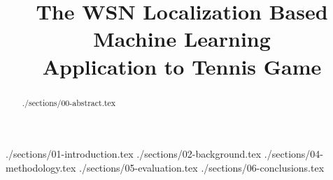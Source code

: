 \documentclass[10pt,conference,compsocconf]{styles/IEEEtran}
\def\SECDIR{./sections}            %
\def\STYDIR{./styles}            %
\begin{document}
%
\title{The WSN Localization Based Machine Learning \\ Application to Tennis Game}

\author{
}


\maketitle


\begin{abstract}
 \SECDIR/00-abstract.tex
\end{abstract}


 \SECDIR/01-introduction.tex
 \SECDIR/02-background.tex
 \SECDIR/04-methodology.tex
 \SECDIR/05-evaluation.tex
 \SECDIR/06-conclusions.tex




\balance



\end{document}
